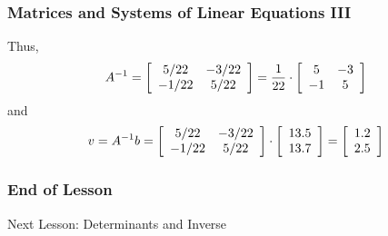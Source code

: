 \documentclass[xcolor=dvipsnames]{beamer}
\begin{document}
\begin{frame}
  \frametitle{Matrices and Systems of Linear Equations III}
Thus,
\begin{equation}
  \label{eq:oogeujie}
  A^{-1}=\left[\begin{array}{cc}
 5/22  & -3/22 \\
 -1/22 & 5/22
               \end{array}\right]=\frac{1}{22}\cdot\left[
               \begin{array}{cc}
                 5 & -3 \\
                 -1 & 5
               \end{array}\right]\notag
\end{equation}
and
\begin{equation}
  \label{eq:seeleeje}
  v=A^{-1}b=\left[\begin{array}{cc}
 5/22  & -3/22 \\
 -1/22 & 5/22
  \end{array}\right]\cdot
\left[\begin{array}{c}
 13.5   \\
 13.7  
  \end{array}\right]=\left[\begin{array}{c}
 1.2   \\
 2.5  
  \end{array}\right]\notag
\end{equation}
\end{frame}

\begin{frame}
  \frametitle{End of Lesson}
Next Lesson: Determinants and Inverse
\end{frame}
\end{document}

